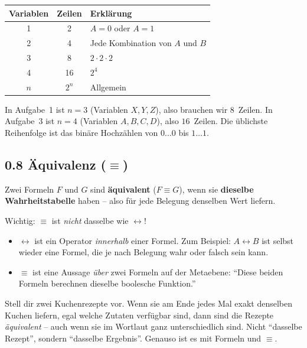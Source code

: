 \documentclass[a4paper,12pt]{article}
\begin{document}
\begin{center}
\renewcommand{\arraystretch}{1.3}
\begin{tabular}{c|c|l}
\toprule
\textbf{Variablen} & \textbf{Zeilen} & \textbf{Erkl\"arung} \\
\midrule
1 & 2 & $A = 0$ oder $A = 1$ \\
2 & 4 & Jede Kombination von $A$ und $B$ \\
3 & 8 & $2 \cdot 2 \cdot 2$ \\
4 & 16 & $2^4$ \\
$n$ & $2^n$ & Allgemein \\
\bottomrule
\end{tabular}
\end{center}

In Aufgabe~1 ist $n = 3$ (Variablen $X, Y, Z$), also brauchen wir
$8$~Zeilen. In Aufgabe~3 ist $n = 4$ (Variablen $A, B, C, D$), also
$16$~Zeilen. Die \"ublichste Reihenfolge ist das bin\"are Hochz\"ahlen
von $0\dots 0$ bis $1\dots 1$.

\subsection*{0.8 \"Aquivalenz ($\equiv$)}

\begin{merkbox}
Zwei Formeln $F$ und $G$ sind \textbf{\"aquivalent} ($F \equiv G$),
wenn sie \textbf{dieselbe Wahrheitstabelle} haben -- also f\"ur jede
Belegung denselben Wert liefern.
\end{merkbox}

Wichtig: $\equiv$ ist \emph{nicht} dasselbe wie $\leftrightarrow$!
\begin{itemize}[nosep]
\item $\leftrightarrow$ ist ein Operator \emph{innerhalb} einer Formel.
      Zum Beispiel: $A \leftrightarrow B$ ist selbst wieder eine
      Formel, die je nach Belegung wahr oder falsch sein kann.
\item $\equiv$ ist eine Aussage \emph{\"uber} zwei Formeln auf der
      Metaebene: "`Diese beiden Formeln berechnen dieselbe boolesche
      Funktion."'
\end{itemize}

\begin{analogie}
Stell dir zwei Kuchenrezepte vor. Wenn sie am Ende jedes Mal exakt
denselben Kuchen liefern, egal welche Zutaten verf\"ugbar sind, dann
sind die Rezepte \emph{\"aquivalent} -- auch wenn sie im Wortlaut
ganz unterschiedlich sind. Nicht "`dasselbe Rezept"', sondern
"`dasselbe Ergebnis"'. Genauso ist es mit Formeln und $\equiv$.
\end{analogie}
\end{document}
